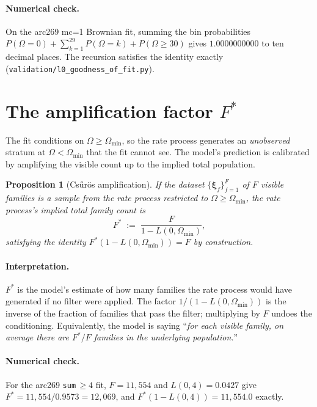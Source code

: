 \documentclass[11pt]{article}
\newcommand{\1}{\mathbf{1}}
\newcommand{\Prof}{\boldsymbol{\xi}}
\newcommand{\Om}{\Omega}
\newtheorem{proposition}[theorem]{Proposition}
\theoremstyle{definition}
\begin{document}
\paragraph{Numerical check.}
On the arc269 mc=1 Brownian fit, summing the bin probabilities
$P(\Om = 0) + \sum_{k=1}^{29} P(\Om = k) + P(\Om \ge 30)$ gives
$1.0000000000$ to ten decimal places. The recursion satisfies the
identity exactly (\texttt{validation/l0\_goodness\_of\_fit.py}).

\section{The amplification factor $F^*$}
\label{sec:Fstar}

The fit conditions on $\Om \ge \Om_{\min}$, so the rate process
generates an \emph{unobserved} stratum at $\Om < \Om_{\min}$ that the
fit cannot see. The model's prediction is calibrated by amplifying
the visible count up to the implied total population.

\begin{proposition}[Cs\H{u}r\"os amplification]\label{prop:Fstar}
If the dataset $\{\Prof_f\}_{f=1}^F$ of $F$ visible families is a
sample from the rate process restricted to $\Om \ge \Om_{\min}$, the
rate process's implied total family count is
\begin{equation}
F^* \;:=\; \frac{F}{1 - L(0, \Om_{\min})},
\label{eq:Fstar}
\end{equation}
satisfying the identity $F^* (1 - L(0, \Om_{\min})) = F$ by
construction.
\end{proposition}

\paragraph{Interpretation.}
$F^*$ is the model's estimate of how many families the rate process
would have generated if no filter were applied. The factor
$1/(1 - L(0, \Om_{\min}))$ is the inverse of the fraction of families
that pass the filter; multiplying by $F$ undoes the conditioning.
Equivalently, the model is saying ``\emph{for each visible family, on
average there are $F^*/F$ families in the underlying population.}''

\paragraph{Numerical check.}
For the arc269 \texttt{sum}\,$\ge 4$ fit, $F = 11{,}554$ and
$L(0, 4) = 0.0427$ give
$F^* = 11{,}554 / 0.9573 = 12{,}069$, and
$F^*(1 - L(0,4)) = 11{,}554.0$ exactly.
\end{document}
